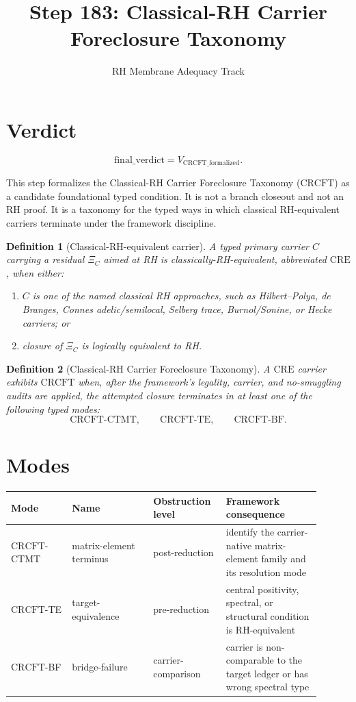 \documentclass[11pt]{article}
\title{Step 183: Classical-RH Carrier Foreclosure Taxonomy}
\author{RH Membrane Adequacy Track}
\date{}
\newtheorem{definition}{Definition}
\newcommand{\CRCFT}{\mathrm{CRCFT}}
\newcommand{\CTMT}{\mathrm{CTMT}}
\newcommand{\CRE}{\mathrm{CRE}}
\newcommand{\XiC}{\Xi_C}
\begin{document}
\maketitle

\section*{Verdict}

\[
\boxed{\mathrm{final\_verdict}=V_{\mathrm{CRCFT\_formalized}}.}
\]

This step formalizes the Classical-RH Carrier Foreclosure Taxonomy
(\(\CRCFT\)) as a candidate foundational typed condition.  It is not a branch
closeout and not an RH proof.  It is a taxonomy for the typed ways in which
classical RH-equivalent carriers terminate under the framework discipline.

\begin{definition}[Classical-RH-equivalent carrier]
A typed primary carrier \(C\) carrying a residual \(\XiC\) aimed at RH is
classically-RH-equivalent, abbreviated \(\CRE\), when either:
\begin{enumerate}
\item \(C\) is one of the named classical RH approaches, such as
Hilbert--Polya, de Branges, Connes adelic/semilocal, Selberg trace,
Burnol/Sonine, or Hecke carriers; or
\item closure of \(\XiC\) is logically equivalent to RH.
\end{enumerate}
\end{definition}

\begin{definition}[Classical-RH Carrier Foreclosure Taxonomy]
A \(\CRE\) carrier exhibits \(\CRCFT\) when, after the framework's legality,
carrier, and no-smuggling audits are applied, the attempted closure terminates
in at least one of the following typed modes:
\[
\CRCFT\text{-}\CTMT,\qquad
\CRCFT\text{-TE},\qquad
\CRCFT\text{-BF}.
\]
\end{definition}

\section*{Modes}

\begin{center}
\begin{tabular}{p{0.18\linewidth}p{0.24\linewidth}p{0.20\linewidth}p{0.28\linewidth}}
\toprule
Mode & Name & Obstruction level & Framework consequence\\
\midrule
\(\CRCFT\)-\(\CTMT\) & matrix-element terminus
& post-reduction
& identify the carrier-native matrix-element family and its resolution mode\\
\(\CRCFT\)-TE & target-equivalence
& pre-reduction
& central positivity, spectral, or structural condition is RH-equivalent\\
\(\CRCFT\)-BF & bridge-failure
& carrier-comparison
& carrier is non-comparable to the target ledger or has wrong spectral type\\
\bottomrule
\end{tabular}
\end{center}
\end{document}
